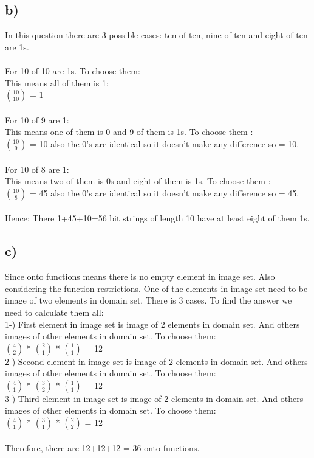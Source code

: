 \documentclass[12pt]{article}
\begin{document}
\subsection*{b)}
In this question there are 3 possible cases: ten of ten, nine of ten and eight of ten are 1s.\\
\\For 10 of 10 are 1s. To choose them:\\
This means all of them is 1:\\
${10 \choose 10}$ = 1\\
\\For 10 of 9 are 1:\\
This means one of them is 0 and 9 of them is 1s. To choose them :\\
${10 \choose 9}$ = 10 also the 0's are identical so it doesn't make any difference so = 10.\\ 
\\For 10 of 8 are 1:\\
This means two of them is 0s and eight of them is 1s. To choose them :\\
${10 \choose 8}$ = 45 also the 0's are identical so it doesn't make any difference so = 45.\\ 
\\
Hence: There 1+45+10=56 bit strings of length 10 have at least eight of them 1s.
\subsection*{c)}
Since onto functions means there is no empty element in image set. Also considering the function restrictions. One of the elements in image set need to be image of two elements in domain set. There is 3 cases. To find the answer we need to calculate them all:\\
1-) First element in image set is image of 2 elements in domain set. And others images of other elements in domain set. To choose them:\\
${4 \choose 2}$ * ${2 \choose 1}$ * ${1 \choose 1}$ = 12\\
2-) Second element in image set is image of 2 elements in domain set. And others images of other elements in domain set. To choose them:\\
${4 \choose 1}$ * ${3 \choose 2}$ * ${1 \choose 1}$ = 12\\
3-) Third element in image set is image of 2 elements in domain set. And others images of other elements in domain set. To choose them:\\
${4 \choose 1}$ * ${3 \choose 1}$ * ${2 \choose 2}$ = 12\\
\\
Therefore, there are 12+12+12 = 36 onto functions.\\
\end{document}
